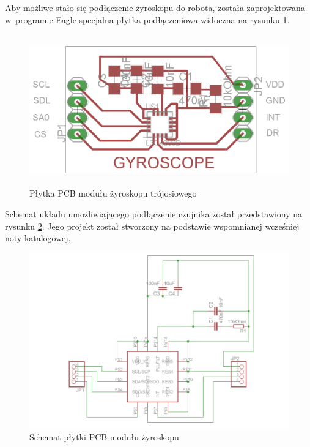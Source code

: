 \newpage
Aby możliwe stało się podłączenie żyroskopu do robota, została zaprojektowana w~programie Eagle specjalna płytka podłączeniowa widoczna na rysunku \ref{fig:L3G4200DPCB}.
\begin{figure}[!ht]
 \centering
 \includegraphics[height=65mm]{../images/ch04/L3G4200Dpcb.png}
 \caption{Płytka PCB modułu żyroskopu trójosiowego}
 \label{fig:L3G4200DPCB}
\end{figure}

Schemat układu umożliwiającego podłączenie czujnika został przedstawiony na
rysunku \ref{fig:L3G4200DSchem}. Jego projekt został stworzony na podstawie
wspomnianej wcześniej noty katalogowej. \begin{figure}[!ht]
 \centering
 \includegraphics[width=\textwidth]{../images/ch04/L3G4200Dschematic.png}
 \caption{Schemat płytki PCB modułu żyroskopu}
 \label{fig:L3G4200DSchem}
\end{figure}

